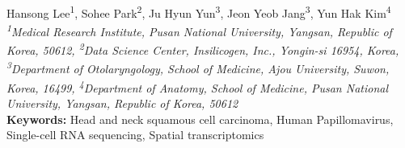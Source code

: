 \begin{center}
Hansong Lee\textsuperscript{1}, Sohee Park\textsuperscript{2}, Ju Hyun Yun\textsuperscript{3}, Jeon Yeob Jang\textsuperscript{3}, Yun Hak Kim\textsuperscript{4} \\
\vspace{0.2cm}
\textit{\textsuperscript{1}Medical Research Institute, Pusan National University, Yangsan, Republic of Korea, 50612, \textsuperscript{2}Data Science Center, Insilicogen, Inc., Yongin-si 16954, Korea, \textsuperscript{3}Department of Otolaryngology, School of Medicine, Ajou University, Suwon, Korea, 16499, \textsuperscript{4}Department of Anatomy, School of Medicine, Pusan National University, Yangsan, Republic of Korea, 50612} \\
\vspace{0.2cm}
\textbf{Keywords:} Head and neck squamous cell carcinoma, Human Papillomavirus, Single-cell RNA sequencing, Spatial transcriptomics
\end{center}


